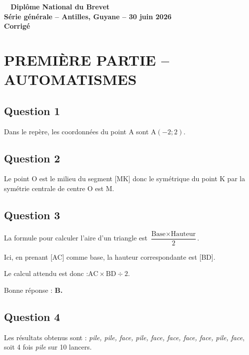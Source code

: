 \documentclass[12pt,a4paper,french]{article}
\begin{document}
\pagestyle{fancy}
\thispagestyle{empty}
\begin{center}\Large \bfseries
	\decofourleft~ Diplôme National du Brevet ~\decofourright\\[10pt]
	Série générale -- Antilles, Guyane -- 30 juin 2026
	 \\[10pt]
	Corrigé
\end{center}

\section*{\centering PREMIÈRE PARTIE -- AUTOMATISMES}
\subsection*{Question 1}
Dans le repère, les coordonnées du point A sont A$(-2 ; 2)$.

\subsection*{Question 2}
Le point O est le milieu du segment [MK] donc le symétrique du point K par la symétrie centrale de centre O est M.

\subsection*{Question 3}
La formule pour calculer l'aire d'un triangle est \quad $\dfrac{\text{Base}\times \text{Hauteur}}{2}$.

Ici, en prenant [AC] comme base, la hauteur correspondante est [BD].

Le calcul attendu est donc :\quad $\mathrm{AC} \times \mathrm{BD}\div 2$.

Bonne réponse : \textbf{B.}

\subsection*{Question 4}
Les résultats obtenus sont : \emph{pile, pile, face, pile, face, face, face, face, pile, face}, soit 4 fois \emph{pile} sur 10 lancers.
\end{document}
